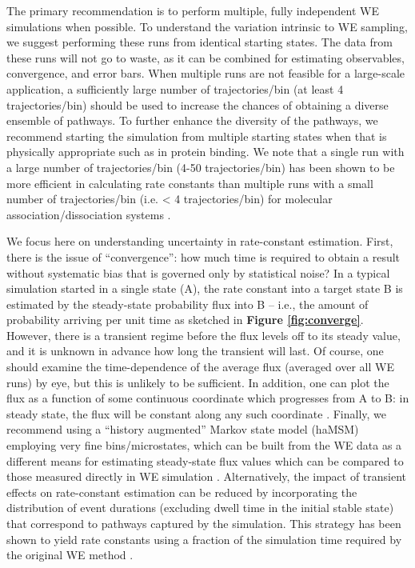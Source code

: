 The primary recommendation is to perform multiple, fully independent WE simulations when possible.
To understand the variation intrinsic to WE sampling, we suggest performing these runs from identical starting states. 
The data from these runs will not go to waste, as it can be combined for estimating observables, convergence, and error bars. 
When multiple runs are not feasible for a large-scale application, a sufficiently large number of trajectories/bin (at least 4 trajectories/bin) should be used to increase the chances of obtaining a diverse ensemble of pathways. 
To further enhance the diversity of the pathways, we recommend starting the simulation from multiple starting states when that is physically appropriate such as in protein binding. 
We note that a single run with a large number of trajectories/bin (4-50 trajectories/bin) has been shown to be more efficient in calculating rate constants than multiple runs with a small number of trajectories/bin (i.e. < 4 trajectories/bin) for molecular association/dissociation systems \citep{Pratt2019}. 

We focus here on understanding uncertainty in rate-constant estimation. 
First, there is the issue of “convergence”: how much time is required to obtain a result without systematic bias that is governed only by statistical noise? 
In a typical simulation started in a single state (A), the rate constant into a target state B is estimated by the steady-state probability flux into B -- i.e., the amount of probability arriving per unit time as sketched in \textbf{Figure \ref{fig:converge}}. 
However, there is a transient regime before the flux levels off to its steady value, and it is unknown in advance how long the transient will last. 
Of course, one should examine the time-dependence of the average flux (averaged over all WE runs) by eye, but this is unlikely to be sufficient. 
In addition, one can plot the flux as a function of some continuous coordinate which progresses from A to B: in steady state, the flux will be constant along any such coordinate \citep{copperman_accelerated_2020}.
Finally, we recommend using a “history augmented” Markov state model (haMSM) employing very fine bins/microstates, which can be built from the WE data as a different means for estimating steady-state flux values which can be compared to those measured directly in WE simulation \citep{copperman_accelerated_2020}. 
Alternatively, the impact of transient effects on rate-constant estimation can be reduced by incorporating the distribution of event durations (excluding dwell time in the initial stable state) that correspond to pathways captured by the simulation. 
This strategy has been shown to yield rate constants using a fraction of the simulation time required by the original WE method \citep{degrave_red_2021}. 

